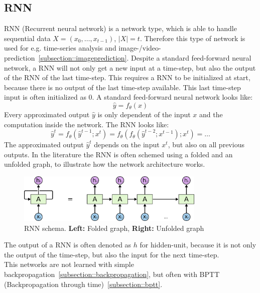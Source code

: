  \subsection{RNN} \label{subsection::rnn}
  RNN (Recurrent neural network) is a network type, which is able to handle sequential data $X = (x_0, \ldots, x_{t-1})$, $|X| = t$. Therefore this type of network is used for e.g. time-series 
  analysis and image-/video-prediction~\ref{subsection::imageprediction}.
  Despite a standard feed-forward neural network, a RNN will not only get a new input at a time-step, but also the output
  of the RNN of the last time-step. This requires a RNN to be initialized at start, because there is no output of the last time-step available. This last time-step input is often initialized as $0$.
  A standard feed-forward neural network looks like:
  \begin{equation}
   \hat{y} = f_{\theta}(x)
  \end{equation}
  Every approximated output $\hat{y}$ is only dependent of the input $x$ and the computation inside the network.
  The RNN looks like:
  \begin{equation}
   \hat{y}^t = f_{\theta}(\hat{y}^{t-1};x^t) = f_{\theta}(f_{\theta}(\hat{y}^{t-2};x^{t-1});x^t) = \ldots
  \end{equation}
  The approximated output $\hat{y}^t$ depends on the input $x^t$, but also on all previous outputs.
  In the literature the RNN is often schemed using a folded and an unfolded graph, to illustrate how the network architecture works.
  \begin{figure}[H]
   \includegraphics[width=0.8\textwidth]{../Images/rnn.png}
   \centering
   \caption{RNN schema. \textbf{Left:} Folded graph, \textbf{Right:} Unfolded graph \cite{Olah2015}}
   \label{fig:lstm_architecture}
  \end{figure}\noindent
  The output of a RNN is often denoted as $h$ for hidden-unit, because it is not only the output of the time-step, but also the input for the next time-step. \label{sentence::hidden}\\
  This networks are not learned with simple backpropagation~\ref{subsection::backpropagation}, but often with BPTT (Backpropagation through time)~\ref{subsection::bptt}.
 
